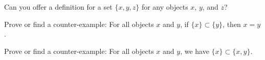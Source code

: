 \begin{xca}
Can you offer a definition for a set $\{x,y,z\}$ for any objects $x$,
$y$, and $z$?
\end{xca}

\begin{xca}\label{xca:enumerated-sets:singleton-subsets-of-singleton}
Prove or find a counter-example: For all objects $x$ and $y$, if
$\{x\}\subset\{y\}$, then $x=y$.
\end{xca}

\begin{xca}\label{xca:enum:singleton-subset-unordered-pair}
Prove or find a counter-example: For all objects $x$ and $y$, we have $\{x\}\subset\{x,y\}$.
\end{xca}
